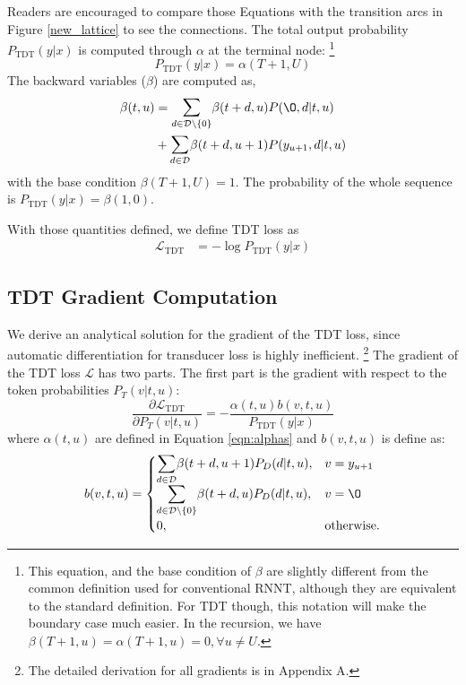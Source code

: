 \documentclass{article}
\begin{document}
Readers are encouraged to compare those Equations with the transition arcs in Figure \ref{new_lattice} to see the connections.
The total output probability $P_\text{TDT}(y|x)$ is computed through $\alpha$ at the terminal node:
\footnote{This equation, and the base condition of $\beta$ are slightly different from the common definition used for conventional RNNT, although they are equivalent to the standard definition. For TDT though, this notation will make the boundary case much easier. In the recursion, we have $\beta(T + 1, u) = \alpha(T + 1, u) = 0, \forall u \neq U$.}
\begin{equation}
    P_\text{TDT}(y | x) = \alpha(T + 1, U)
\end{equation}
The backward variables ($\beta$) are computed as,
\begin{equation}
\label{eqn:betas}
\begin{split}
    \beta(t, u) & =  \mathlarger\sum_{d\in \mathcal{D}\setminus{\{0\}}} \beta(t + d, u) P(\O, d | t, u)\\
    & + \mathlarger\sum_{d\in \mathcal{D}} \beta(t+d, u + 1) P(y_{u+1}, d | t, u)\\
\end{split}
\end{equation}
with the base condition $ \beta(T + 1, U) = 1$. 
The probability of the whole sequence is $ P_\text{TDT}(y | x) = \beta(1,0)$. 


With those quantities defined, we define TDT loss as
\begin{align}
    \label{eqn:TDT_loss}
    \mathcal{L}_\text{TDT} &= -\log P_\text{TDT}(y | x)
\end{align}


\subsection{TDT Gradient Computation} \label{gradient}

We derive an analytical solution for the gradient of the TDT loss, since automatic differentiation  for transducer loss is highly inefficient.
\footnote{The detailed derivation for all gradients is in Appendix A.} The gradient of the TDT loss $\mathcal{L}$ has two parts. 
The first part is the gradient with respect to the token probabilities $P_T(v | t, u)$: 
\begin{equation} 
    \label{token}
    \frac{\partial \mathcal{L}_\text{TDT}}{\partial P_T(v|t, u)} = -\frac{\alpha(t,u) b(v, t, u) }{P_\text{TDT}(y|x)} 
\end{equation}
where $\alpha(t,u)$ are defined in Equation \ref{eqn:alphas} and $b(v, t, u)$ is define as:
\begin{equation} \label{eqn:B_vtu}
    b(v, t, u) = \begin{cases}
        \mathlarger\sum\limits_{d\in \mathcal{D}} \beta(t+d,u+1) P_D(d | t, u),  & v = y_{u+1} \\
        \mathlarger\sum\limits_{d\in \mathcal{D} \setminus{\{0\} }} \beta(t+d,u) P_D(d| t, u),  & v = \O \\
        0,             & \text{otherwise.} \\
    \end{cases}
\end{equation}
\end{document}
